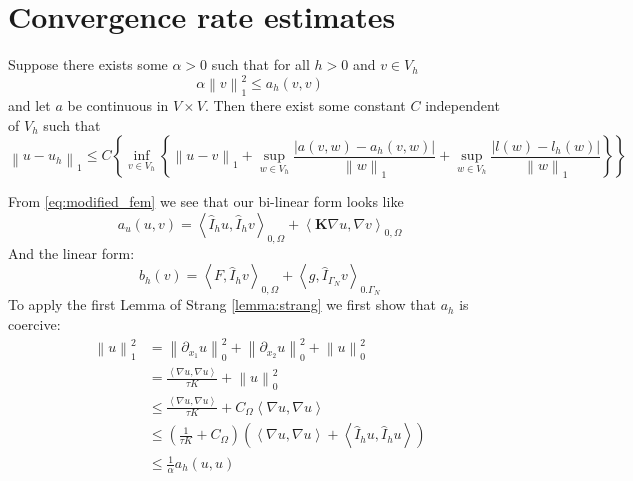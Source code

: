 \documentclass[../Main/main.tex]{subfiles}
\begin{document}
	\section*{Convergence rate estimates}
	\begin{lemma}\label{lemma:strang}
		Suppose there exists some $\alpha>0$ such that for all $h>0$ and $v\in V_h$
		\begin{equation*}
			\alpha \left \| v \right \|^2_1 \leq a_h(v,v) 
		\end{equation*}
		and let $a$ be continuous in $V\times V$. Then there exist some constant $C$ independent of $V_h$ such that
		\begin{equation}\label{eq:strang_ineq}
			\left \| u-u_h \right \|_1 \leq C\left \{ \inf_{v \in V_h}\left \{ \left \| u-v \right \|_1 + \sup_{w\in V_h}\frac{|a(v,w)-a_h(v,w)|}{\left \| w \right \|_1}+\sup_{w\in V_h}\frac{|l(w)-l_h(w)|}{\left \| w \right \|_1} \right \} \right \}
		\end{equation}
	\end{lemma}
	From \eqref{eq:modified_fem} we see that our bi-linear form looks like
	\begin{equation}
		a_u(u,v) = \left \langle \hat{I}_h u, \hat{I}_h v \right \rangle_{0,\Omega} +  \left \langle \pmb{K} \nabla u, \nabla v \right \rangle_{0,\Omega} 
	\end{equation}
	And the linear form:
	\begin{equation}
		b_h(v)= \left \langle F,\hat{I}_h v \right \rangle_{0,\Omega} + \left \langle g,\hat{I}_{\Gamma_N} v \right \rangle_{0.\Gamma_N}
	\end{equation}
	To apply the first Lemma of Strang \ref{lemma:strang} we first show that $a_h$ is coercive:
	\begin{equation}
		\begin{aligned}
			\left \| u \right \|_1^2 &= \left \| \partial_{x_1} u \right \|_0^2 + \left \| \partial_{x_2} u \right \|_0^2 + \left \| u \right \|_0^2 \\
			&= \frac{\left \langle \nabla u,\nabla u \right \rangle}{\tau K} + \left \| u \right \|_0^2 \\
			&\leq \frac{\left \langle \nabla u,\nabla u \right \rangle}{\tau K} + C_{\Omega} \left \langle \nabla u, \nabla u \right \rangle \\
			&\leq (\frac{1}{\tau K} + C_{\Omega})(\left \langle \nabla u, \nabla u \right \rangle + \left \langle \hat{I}_h u, \hat{I}_h u \right \rangle)\\
			&\leq \frac{1}{\alpha} a_h(u,u) 
		\end{aligned}
	\end{equation} 
\end{document}
